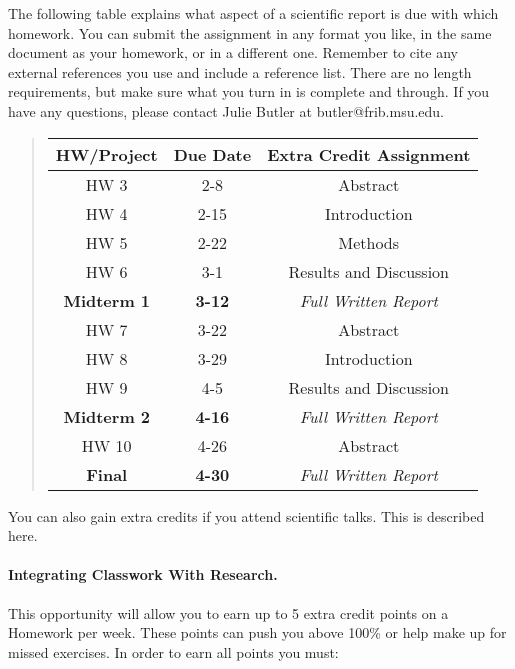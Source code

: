 \documentclass[%
oneside,                 %
final,                   %
10pt]{article}
\begin{document}
The following table explains what aspect of a scientific report is due
with which homework.  You can submit the assignment in any format you
like, in the same document as your homework, or in a different one.
Remember to cite any external references you use and include a
reference list.  There are no length requirements, but make sure what
you turn in is complete and through.  If you have any questions,
please contact Julie Butler at butler@frib.msu.edu.


\begin{quote}
\begin{tabular}{ccc}
\hline
\multicolumn{1}{c}{ HW/Project } & \multicolumn{1}{c}{ Due Date } & \multicolumn{1}{c}{ Extra Credit Assignment } \\
\hline
HW 3               & 2-8           & Abstract                   \\
HW 4               & 2-15          & Introduction               \\
HW 5               & 2-22          & Methods                    \\
HW 6               & 3-1           & Results and Discussion     \\
\textbf{Midterm 1} & \textbf{3-12} & \emph{Full Written Report} \\
HW 7               & 3-22          & Abstract                   \\
HW 8               & 3-29          & Introduction               \\
HW 9               & 4-5           & Results and Discussion     \\
\textbf{Midterm 2} & \textbf{4-16} & \emph{Full Written Report} \\
HW 10              & 4-26          & Abstract                   \\
\textbf{Final}     & \textbf{4-30} & \emph{Full Written Report} \\
\hline
\end{tabular}
\end{quote}

\noindent

You can also gain extra credits if you attend scientific talks.
This is described here.


\paragraph{Integrating Classwork With Research.}
This opportunity will allow you to earn up to 5 extra credit points on a Homework per week. These points can push you above 100\% or help make up for missed exercises.
In order to earn all points you must:
\end{document}
